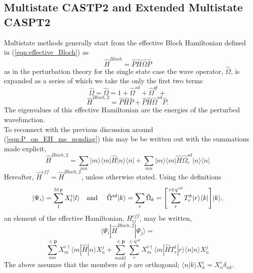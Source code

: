 \documentclass[12pt]{article}
\begin{document}
\subsection{ Multistate CASTP2 and Extended Multistate CASPT2 }

\noindent Multistate methods generally start from the effective Bloch Hamiltonian defined in 
(\ref{eqn:effective_Bloch}) as 
\begin{equation}
\hat{H}^{Bloch} = \hat{P}\hat{H}\hat{\Omega}\hat{P}
\label{eqn:effective_Bloch_opform}
\end{equation}
as in the perturbation theory for the single state case the wave operator, $\hat{\Omega}$, is expanded as a series 
of which we take the only the first two terms
\begin{equation}
\hat{\Omega} =\hat{\Omega} =  1 + \hat{\Omega}^{sd}+ \hat{\Omega}^{qt}+ 
\end{equation}
\begin{equation}
\hat{H}^{Bloch,2} = \hat{P}\hat{H}\hat{P} +  \hat{P}\hat{H}\hat{\Omega}^{sd}\hat{P}.
\label{eqn:effective_Bloch_opform_secondorder}
\end{equation}
The eigenvalues of this effective Hamiltonian are the energies of the perturbed wavefunction.\\

\noindent To reconnect with the previous discussion around (\ref{eqn:P_on_EH_ms_nondiag}) this may be 
be written out with the summations made explicit,
\begin{equation}
\hat{H}^{Bloch,2} = 
\sum_{mn}|m\rangle\langle m | \hat{H} |n \rangle\langle n|+
\sum_{mn}|m\rangle\langle m | \hat{H}\hat{\Omega}^{sd}_{r} |n \rangle\langle n|
\label{eqn:effective_Bloch_summation_explicit}
\end{equation}
Hereafter, $ \hat{H}^{eff} =  \hat{H}^{Bloch,2} $, unless otherwise stated. Using the definitions 
\begin{equation}
|\Psi_{i}\rangle = \sum_{l}^{l \in \mathrm{p}} X_{l}^{i} | l \rangle
\text{\ \ \ and \ \ \ }
\hat{\Omega}^{sd}| k \rangle  = \sum_{r} \hat{\Omega}_{k} = \Bigg{[}\sum_{r}^{r \in q^{sd}} T^{k}_{r} |r\rangle\langle k |\Bigg{]} |  k \rangle,
\end{equation}
an element of the effective Hamiltonian, $H_{ij}^{eff}$, may be written,
\begin{equation*}
\langle \Psi_{i} | \hat{H}^{Bloch,2} | \Psi_{j} \rangle =
\end{equation*}
\begin{equation}
\sum_{mn}^{\in \mathbf{p}}
X^{i\dagger}_{m} \langle m | \hat{H} |n \rangle  X^{j}_{n}
+\sum_{mnkl}^{\in \mathbf{p} }\sum_{r}^{\in \mathrm{q}^{sd}}
X^{i\dagger}_{m}\langle m |
\hat{H} T^{l}_{r}
|r \rangle\langle n | n \rangle  X^{j}_{n}
\label{eqn:effective_Bloch_summation_explicit}
\end{equation}
The above assumes that the members of p are orthogonal; $\langle n | k \rangle X^{i}_{k} = X^{i}_{n}\delta_{nk}$. \\ 
\end{document}

